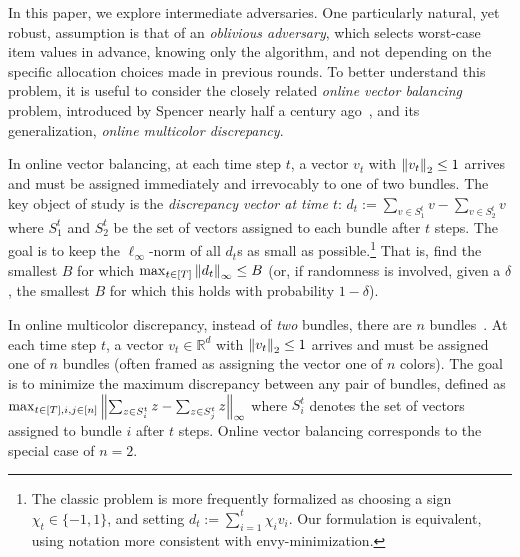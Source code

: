 In this paper, we explore intermediate adversaries. One particularly natural, yet robust, assumption is that of an \emph{oblivious adversary}, which selects worst-case item values in advance, knowing only the algorithm, and not depending on the specific allocation choices made in previous rounds. To better understand this problem, it is useful to consider the closely related \emph{online vector balancing} problem, introduced by Spencer nearly half a century ago~\cite{spencer1977balancing}, and its generalization, \emph{online multicolor discrepancy}.

In online vector balancing, at each time step $t$, a vector $v_t$ with $\left\lVert v_t\right\rVert_2 \leq 1$ arrives and must be assigned immediately and irrevocably to one of two bundles. The key object of study is the \emph{discrepancy vector at time $t$}: $d_t := \sum_{v \in S_1^t} v - \sum_{v \in S_2^t} v$ where $S_1^t$ and $S_2^t$ be the set of vectors assigned to each bundle after $t$ steps. The goal is to keep the $\ell_{\infty}$-norm of all $d_t$s as small as possible.\footnote{The classic problem is more frequently formalized as choosing a sign $\chi_t \in \{-1, 1\}$, and setting $d_t := \sum_{i = 1}^t \chi_i v_i$. Our formulation is equivalent, using notation more consistent with envy-minimization.} That is, find the smallest $B$ for which $\max_{t \in [T]} \left\lVert d_t \right\rVert_{\infty} \leq B$ (or, if randomness is involved, given a $\delta$, the smallest $B$ for which this holds with probability $1 - \delta$).

In online multicolor discrepancy, instead of \emph{two} bundles, there are $n$ bundles~\cite{bansal2021online}. At each time step $t$, a vector $v_t \in \mathbb{R}^d$ with $\left\lVert v_t\right\rVert_2 \le 1$ arrives and must be assigned one of $n$ bundles (often framed as assigning the vector one of $n$ colors). The goal is to minimize the maximum discrepancy between any pair of bundles, defined as $\max_{t \in [T], i,j \in [n]} \left\lVert \sum_{z \in S^t_{i}} z - \sum_{z \in S^t_{j}} z \right\rVert_{\infty}$ where $S_i^t$ denotes the set of vectors assigned to bundle $i$ after $t$ steps. Online vector balancing corresponds to the special case of $n = 2$.

